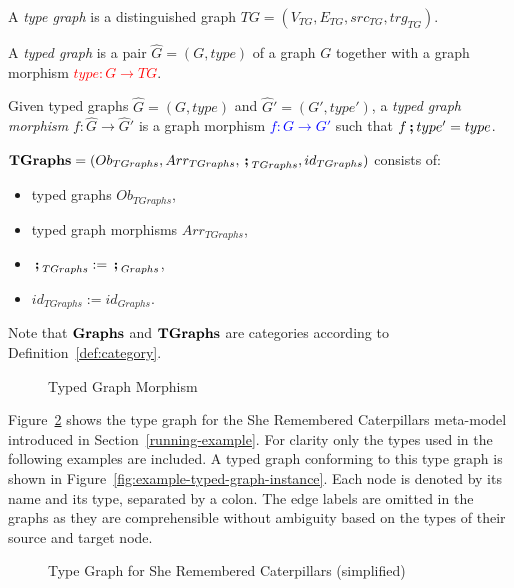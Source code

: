 \begin{definition}
	\label{def:typed-graphs}%
	A \emph{type graph} is a distinguished graph $TG = (V_{TG}, E_{TG}, src_{TG}, trg_{TG})$.

	\gap
	A \emph{typed graph} is a pair $\hat{G} = (G, type)$ of a graph $G$ together with a graph morphism \textcolor{red}{$type: G \rightarrow TG$}.

	\gap
	Given typed graphs $\hat{G} = (G, type)$ and $\hat{G}' = (G', type')$, a \emph{typed graph morphism} $f: \hat{G} \rightarrow \hat{G}'$ is a graph morphism \textcolor{blue}{$f: G \rightarrow G'$} such that $f \textbf{\,;\,} type' = type$.

	\gap
	$\textbf{TGraphs} = (Ob_{TGraphs}, Arr_{TGraphs}, \textbf{\,;\,}_{TGraphs}, id_{TGraphs})$ consists of:
	\begin{itemize}
		\item typed graphs $Ob_{TGraphs}$,
		\item typed graph morphisms $Arr_{TGraphs}$,
		\item $\textbf{\,;\,}_{TGraphs} := \textbf{\,;\,}_{Graphs}$,
		\item $id_{TGraphs} := id_{Graphs}$.
	\end{itemize}
\end{definition}

\noindent
Note that $\textbf{Graphs}$ and $\textbf{TGraphs}$ are categories according to Definition~\ref{def:category}.

\begin{figure}[h!]
	\centering
	
	\caption{Typed Graph Morphism}
	\label{fig:typed-graph}
\end{figure}

\noindent
Figure~\ref{fig:example-type-graph} shows the type graph for the She Remembered Caterpillars meta-model introduced in Section~\ref{running-example}.
For clarity only the types used in the following examples are included.
A typed graph conforming to this type graph is shown in Figure~\ref{fig:example-typed-graph-instance}.
Each node is denoted by its name and its type, separated by a colon.
The edge labels are omitted in the graphs as they are comprehensible without ambiguity based on the types of their source and target node.

\begin{figure}[h!]
	\centering
	
	\caption{Type Graph for She Remembered Caterpillars (simplified)}
	\label{fig:example-type-graph}
\end{figure}

